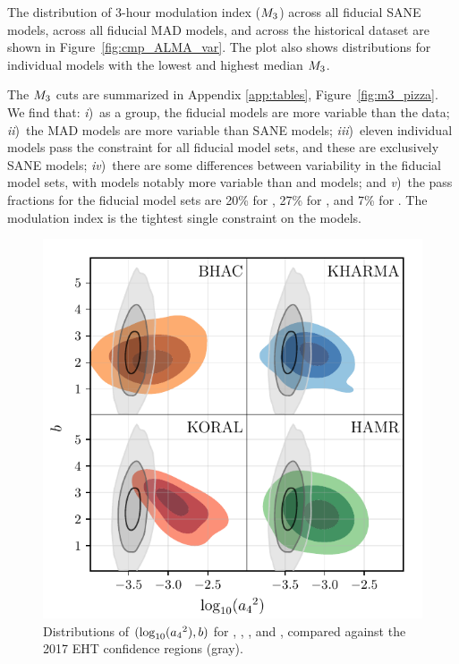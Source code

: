 
The distribution of 3-hour modulation index ($M_{3}$) across all fiducial SANE models, across all fiducial MAD models, and across the historical dataset are shown in Figure~\ref{fig:cmp_ALMA_var}.
The plot also shows distributions for individual models with the lowest and highest median $M_{3}$.

The $M_{3}$ cuts are summarized in Appendix \ref{app:tables}, Figure~\ref{fig:m3_pizza}.
We find that:
\emph{i})~as a group, the fiducial models are more variable than the data;
\emph{ii})~the MAD models are more variable than SANE models;
\emph{iii})~eleven individual models  pass the constraint for all fiducial model sets, and these are exclusively SANE models;
\emph{iv})~there are some differences between variability in the fiducial model sets, with \hamr models notably more variable than \kharma and \bhac models; and
\emph{v})~the pass fractions for the fiducial model sets are 20\% for \kharma, 27\% for \bhac, and 7\% for \hamr.
The modulation index is the tightest single constraint on the models.


\begin{figure}
  \centering
  \includegraphics[width=\columnwidth]{./figures/grmhd_triangle_debiased_combined.pdf}
  \caption{Distributions of $(\log_{10}({a_4}^2), b)$ for \bhac, \kharma, \koral, and \hamr, compared against the 2017 EHT confidence regions (gray).}
  \label{fig:cmp_VLBI_var}
\end{figure}

